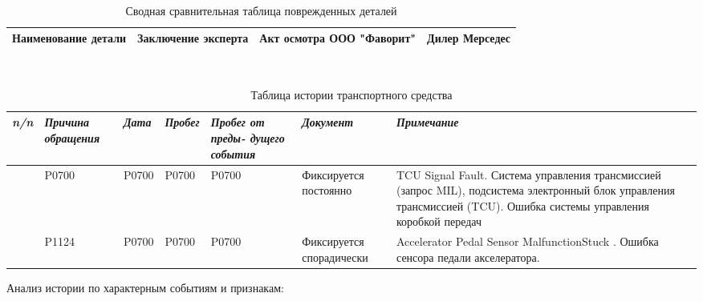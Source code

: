 {\footnotesize \
	\begin{longtable}{|p{25mm}|p{50mm}|p{50mm}|p{25mm}|}
		\caption{\footnotesize {Сводная сравнительная таблица поврежденных деталей}}
		\label{tab:sravnenie}\\ \hline
		\textbf{Наименование детали} & \textbf{Заключение эксперта} & \textbf{Акт осмотра ООО "Фаворит"} & \textbf{Дилер Мерседес} \\ \hline \endhead
		
		
\end{longtable}}



{\footnotesize \
\begin{longtable}[h]{c|m{25mm}|m{15mm}|m{15mm}|m{15mm}|m{30mm}|m{35mm}}
	\caption{Таблица истории транспортного средства}
	\label{table:история}\\ \hline
			\textit{\textbf{n/n}} 
			&\textit{\textbf{Причина обращения}} 
			&\textit{\textbf{Дата}} 
			&\textit{\textbf{Пробег}}
			&\textit{\textbf{Пробег от преды- дущего события}} 
	    	&\textit{\textbf{Документ}} 
		    &\textit{\textbf{Примечание}} \\
		\hline \endhead
		\Rownum & P0700 & P0700 & P0700 & P0700 & Фиксируется постоянно & TCU Signal Fault. Система управления трансмиссией (запрос MIL), подсистема электронный блок управления трансмиссией (TCU). Ошибка системы управления коробкой передач \\
		\hline
		\Rownum & P1124 & P0700 & P0700 & P0700 & Фиксируется спорадически & Accelerator Pedal Sensor MalfunctionStuck . Ошибка сенсора педали акселератора.\\ \hline
	\end{longtable}}\setcounter{rownum}{0}
Анализ истории по характерным событиям и признакам:


